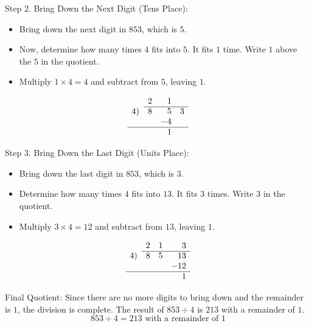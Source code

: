 \vspace{\baselineskip}\par
Step 2. Bring Down the Next Digit (Tens Place):
 \begin{itemize}
    \item Bring down the next digit in \( 853 \), which is \( 5 \).
    \item Now, determine how many times \( 4 \) fits into \( 5 \). It fits \( 1 \) time. Write \( 1 \) above the \( 5 \) in the quotient.
    \item Multiply \( 1 \times 4 = 4 \) and subtract from \( 5 \), leaving \( 1 \).
\end{itemize}
\[
\begin{array}{rrrr}
       & 2 & 1  &  \\
       \cline{2-4}
    4) & 8 & 5 & 3 \\
       &  & -4  &    \\
\hline
    & & 1 &\\
\end{array}
\]

\vspace{\baselineskip}\par
Step 3. Bring Down the Last Digit (Units Place):
 \begin{itemize}
    \item Bring down the last digit in \( 853 \), which is \( 3 \).
    \item Determine how many times \( 4 \) fits into \( 13 \). It fits \( 3 \) times. Write \( 3 \) in the quotient.
    \item Multiply \( 3 \times 4 = 12 \) and subtract from \( 13 \), leaving \( 1 \).
  \end{itemize}
\[
\begin{array}{rrrr}
       & 2 & 1 & 3 \\
       \cline{2-4}
    4) & 8 & 5 & 13 \\
       &  &   & -12   \\
\hline
    & &  & 1 \\
\end{array}
\]

\vspace{\baselineskip}\par
Final Quotient:
Since there are no more digits to bring down and the remainder is \( 1 \), the division is complete. The result of \( 853 \div 4 \) is \( 213 \) with a remainder of \( 1 \).
\[
853 \div 4 = 213 \text{ with a remainder of } 1
\]



